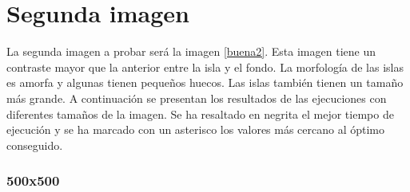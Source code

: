 \section{Segunda imagen}

La segunda imagen a probar ser\'{a} la imagen \ref{buena2}. Esta imagen tiene un contraste mayor que la anterior entre la isla y el fondo. La morfolog\'{i}a de las islas es amorfa y algunas tienen peque\~{n}os huecos. Las islas tambi\'{e}n tienen un tama\~{n}o m\'{a}s grande. A continuaci\'{o}n se presentan los resultados de las ejecuciones con diferentes tama\~{n}os de la imagen. Se ha resaltado en negrita el mejor tiempo de ejecuci\'{o}n y se ha marcado con un asterisco los valores m\'{a}s cercano al \'{o}ptimo conseguido.

\subsubsection{500x500}

